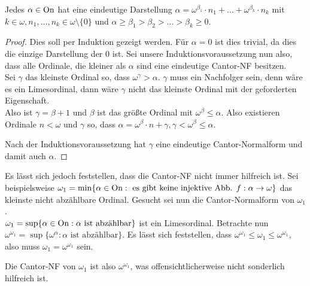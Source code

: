 \begin{satz}
	Jedes $\alpha\in \operatorname{On}$ hat eine eindeutige Darstellung $\alpha=\omega^{\beta_1}\cdot n_1+\dots+\omega^{\beta_k}\cdot n_k$ mit $k\in\omega, n_1,\dots, n_k\in\omega\setminus\{0\}$ und $\alpha\geq\beta_1>\beta_2>\dots>\beta_k\geq0$.
\end{satz}
\begin{proof}
	Dies soll per Induktion gezeigt werden. Für $\alpha=0$ ist dies trivial, da dies die einzige Darstellung der $0$ ist. Sei unsere Induktionsvoraussetzung nun also, dass alle Ordinale, die kleiner als $\alpha$ sind eine eindeutige Cantor-NF besitzen.
	\\
	Sei $\gamma$ das kleinste Ordinal so, dass $\omega^\gamma>\alpha$. $\gamma$ muss ein Nachfolger sein, denn wäre es ein Limesordinal, dann wäre $\gamma$ nicht das kleinste Ordinal mit der geforderten Eigenschaft.
	\\
	Also ist $\gamma=\beta+1$ und $\beta$ ist das größte Ordinal mit $\omega^\beta \leq \alpha$. Also existieren Ordinale $n<\omega$ und $\gamma$ so, dass $\alpha=\omega^\beta\cdot n+\gamma, \gamma<\omega^\beta\leq\alpha$.
	
	Nach der Induktionsvoraussetzung hat $\gamma$ eine eindeutige Cantor-Normalform und damit auch $\alpha$.
\end{proof}

Es lässt sich jedoch feststellen, dass die Cantor-NF nicht immer hilfreich ist. Sei beispielsweise $\omega_1=\min\{\alpha\in \operatorname{On} : \text{ es gibt keine injektive Abb. } f:\alpha\to\omega\}$ das kleinste nicht abzählbare Ordinal. Gesucht sei nun die Cantor-Normalform von $\omega_1$.
\\
$\omega_1=\sup\{\alpha\in \operatorname{On} : \alpha \text{ ist abzählbar}\}$ ist ein Limesordinal. Betrachte nun $\omega^{\omega_1}=\sup\{\omega^\alpha : \alpha \text{ ist abzählbar}\}$. Es lässt sich feststellen, dass $\omega^{\omega_1}\leq\omega_1\leq\omega^{\omega_1}$, also muss $\omega_1=\omega^{\omega_1}$ sein.

Die Cantor-NF von $\omega_1$ ist also $\omega^{\omega_1}$, was offensichtlicherweise nicht sonderlich hilfreich ist.

